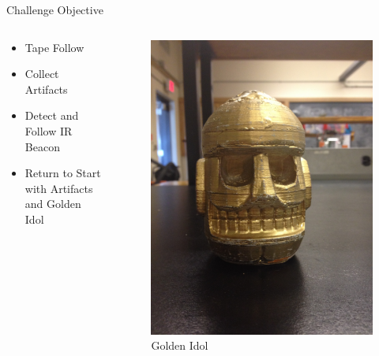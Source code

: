 \documentclass[aspectratio=43]{beamer}
\begin{document}
  \begin{frame}{Challenge Objective}
    \begin{columns}[c]
      \begin{column}[c]{5cm}
        \begin{itemize}
          \item Tape Follow
          \item Collect Artifacts
          \item Detect and Follow IR Beacon
          \item Return to Start with Artifacts and Golden Idol
        \end{itemize}
      \end{column}
      \begin{column}[c]{5cm}
        \begin{figure}[h]
          \centering
          \includegraphics[scale = 0.05, angle=-90]{GoldIdol.jpeg}
          \vspace{7pt}
          \large{Golden Idol}
        \end{figure}
      \end{column}
    \end{columns}
  \end{frame} 
  
\end{document}
